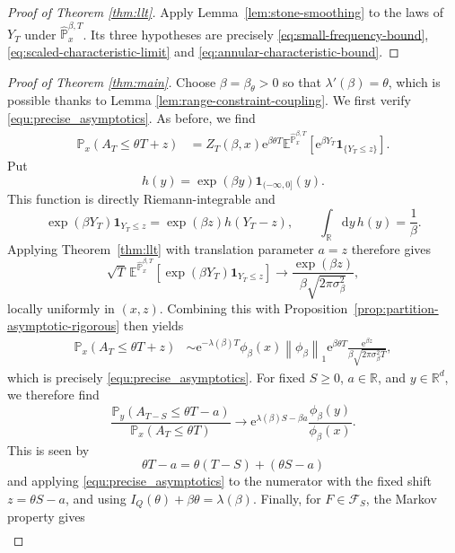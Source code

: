 \documentclass[11pt,reqno]{amsart}
\theoremstyle{definition}
\numberwithin{equation}{section}
\newcommand{\<}{\langle}
\renewcommand{\>}{\rangle}
\def\cF{{\mathcal F}}
\def\de{{\rm d}}
\def\prob{{\mathbb P}}
\def\de{{\mathrm {d}}}
\def\lt{\left}
\def\rt{\right}
\def\bbE{{\mathbb{E}}}
\def\bbP{{\mathbb{P}}}
\def\bbPh{{\hat{\mathbb{P}}}}
\def\cF{{\mathcal{F}}}
\newcommand{\norm}[1]{{\lt\|#1\rt\|}}
\begin{document}
\begin{proof}[Proof of Theorem \ref{thm:llt}]
Apply Lemma~\ref{lem:stone-smoothing} to the laws of $Y_T$ under
$\hat\prob^{\beta,T}_x$.  Its three hypotheses are precisely
\eqref{eq:small-frequency-bound},\eqref{eq:scaled-characteristic-limit}
 and
\eqref{eq:annular-characteristic-bound}.
\end{proof}

\begin{proof}[Proof of Theorem \ref{thm:main}]
        Choose $\beta = \beta_\theta>0$ so that $\lambda'(\beta )=\theta$, which is possible thanks to Lemma \ref{lem:range-constraint-coupling}. We first verify \eqref{equ:precise_asymptotics}.
    As before, we find
\begin{align*}
 \prob_x(A_T\leq\theta T+z)
 &=Z_T(\beta,x)\mathrm e^{\beta\theta T}
   \bbE^{\bbPh_x ^{\beta,T}}
   \left[\mathrm e^{\beta Y_T}\mathbf 1_{\{Y_T\leq z\}}\right].
\end{align*}
Put
\[h(y)=\exp(\beta y)\mathbf 1_{(-\infty,0]}(y).
\]
This function is directly Riemann-integrable and
\[\exp(\beta Y_T)\mathbf 1_{{Y_T\leq z}}=\exp(\beta z)h(Y_T-z),\qquad\int_{\mathbb R} \de y \, h(y)=\frac{1}{\beta}.\]
Applying Theorem~\ref{thm:llt} with translation parameter  $a=z $ therefore gives
\[\sqrt T\,\mathbb E^{\hat{\bbP}_x ^{\beta,T}}\left[\exp(\beta Y_T)\mathbf 1_{{Y_T\leq z}}\right]\longrightarrow\frac{\exp(\beta z)}{\beta\sqrt{2\pi\sigma_\beta^2}},
\]
locally uniformly in  $(x,z) $.
Combining this with Proposition~\ref{prop:partition-asymptotic-rigorous} then yields
\begin{align*}
 \prob_x(A_T\leq\theta T+z)
 &\sim
 \mathrm e^{-\lambda(\beta)T}\phi_\beta(x)\norm{\phi_\beta}_1
 \mathrm e^{\beta\theta T}
 \frac{\mathrm e^{\beta z}}
      {\beta\sqrt{2\pi\sigma_\beta^2T}},
\end{align*}
which is precisely \eqref{equ:precise_asymptotics}. For fixed $S\geq0$, $a\in\mathbb R$, and $y\in\mathbb R^d$, we therefore find
\begin{equation}
    \nonumber
 \frac{\prob_y(A_{T-S}\leq\theta T-a)}
      {\prob_x(A_T\leq\theta T)}
 \longrightarrow
 \mathrm e^{\lambda(\beta)S-\beta a}
 \frac{\phi_\beta(y)}{\phi_\beta(x)}.
\end{equation}
This is seen by
\[
 \theta T-a=\theta(T-S)+(\theta S-a)
\]
and applying \eqref{equ:precise_asymptotics} to the numerator with the fixed shift
$z=\theta S-a$, and using  $I_Q(\theta)+\beta\theta=\lambda(\beta)$.
Finally,
for $F\in\cF_S$, the Markov property gives
\begin{align}

\end{align}
\end{proof}
\end{document}
